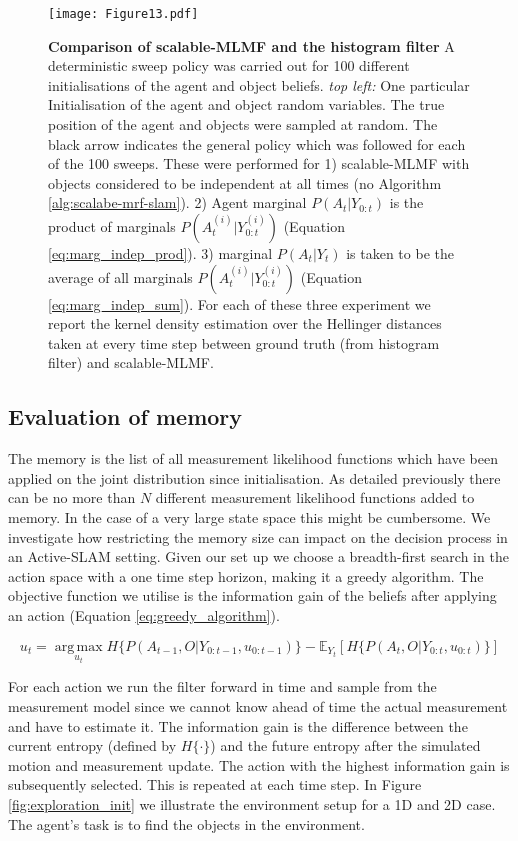 \documentclass[review]{elsarticle}
\numberwithin{equation}{section}
\begin{document}
\begin{figure}
 \texttt{[image: Figure13.pdf]}
 \caption{\textbf{Comparison of scalable-MLMF and the histogram filter} A deterministic sweep policy was carried out for 100 different initialisations of 
 the agent and object beliefs. \textit{top left:} One particular Initialisation of the agent and object
 random variables. The true position of the agent and objects were sampled at random. The black arrow indicates the general policy which was 
 followed for each of the 100 sweeps. 
 These were performed for 1) scalable-MLMF  with objects considered to be independent at all times (no Algorithm \ref{alg:scalabe-mrf-slam}). 2) 
 Agent marginal $P(A_t|Y_{0:t})$ is the product of marginals $P(A^{(i)}_t|Y^{(i)}_{0:t})$ (Equation \ref{eq:marg_indep_prod}). 
 3) marginal $P(A_t|Y_t)$ is taken to be the average 
 of all marginals $P(A^{(i)}_t|Y^{(i)}_{0:t})$ (Equation \ref{eq:marg_indep_sum}).  For each of these three experiment we report the 
 kernel density estimation over the Hellinger distances taken at every time step between ground truth (from histogram filter) and scalable-MLMF.}
 \label{fig:independence_assumption_test}
\end{figure}

\subsection{Evaluation of memory}

The memory is the list of all measurement likelihood functions which have been applied on the joint 
distribution since initialisation. As detailed previously there can be no more than $N$ different measurement likelihood functions added to 
memory. In the case of a very large state space this might be cumbersome. We investigate how restricting the memory size 
can impact on the decision process in an Active-SLAM setting. Given our set up we choose a breadth-first search in the action 
space with a one time step horizon, making it a greedy algorithm. The objective function we utilise is the information
gain of the beliefs after applying an action (Equation \ref{eq:greedy_algorithm}).

\begin{equation}\label{eq:greedy_algorithm}
 u_{t} = \operatorname*{arg\,max}_{u_t} H\{P(A_{t-1},O|Y_{0:t-1},u_{0:t-1})\} - \mathbb{E}_{Y_t}\left[H\{P(A_{t},O|Y_{0:t},u_{0:t})\}\right]
\end{equation}

For each action we run the filter forward in time and sample from the measurement model since we cannot know ahead of time the actual 
measurement and have to estimate it. The information gain is the difference between the current entropy (defined 
by $H\{\cdot\}$) and the future entropy after the simulated motion and measurement update. The action with the highest information gain 
is subsequently selected. This is repeated at each time step. In Figure \ref{fig:exploration_init} we illustrate the environment setup for 
a 1D and 2D case. The agent's task is to find the objects in the environment.
\end{document}

